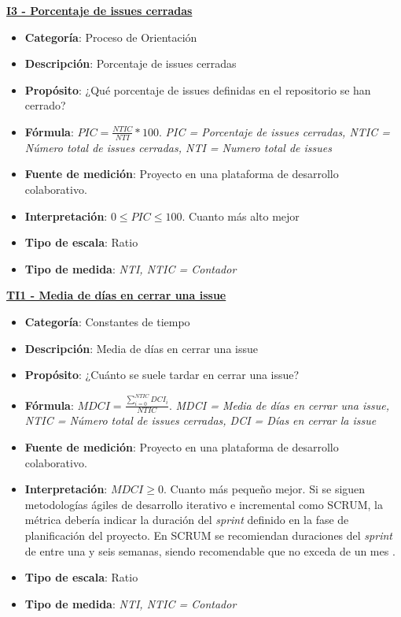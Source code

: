 \textbf{\underline{I3 - Porcentaje de issues cerradas}}

\begin{itemize}
	\item \textbf{Categoría}: Proceso de Orientación
	\item \textbf{Descripción}: Porcentaje de issues cerradas
	\item \textbf{Propósito}: ¿Qué porcentaje de issues definidas en el repositorio se han cerrado?
	\item \textbf{Fórmula}: $PIC = \frac{NTIC}{NTI}*100$. \textit{PIC = Porcentaje de issues cerradas, NTIC = Número total de issues cerradas, NTI = Numero total de issues}
	\item \textbf{Fuente de medición}: Proyecto en una plataforma de desarrollo colaborativo.
	\item \textbf{Interpretación}: $0 \leq PIC \leq 100$. Cuanto más alto mejor
	\item \textbf{Tipo de escala}: Ratio
	\item \textbf{Tipo de medida}: \textit{NTI, NTIC = Contador}
\end{itemize}

\textbf{\underline{TI1 - Media de días en cerrar una issue}}

\begin{itemize}
	\item \textbf{Categoría}: Constantes de tiempo
	\item \textbf{Descripción}:  Media de días en cerrar una issue
	\item \textbf{Propósito}: ¿Cuánto se suele tardar en cerrar una issue? 
	\item \textbf{Fórmula}: $MDCI = \frac{\sum_{i=0}^{NTIC}DCI_i}{NTIC}$. \textit{MDCI = Media de días en cerrar una issue, NTIC = Número total de issues cerradas, DCI = Días en cerrar la issue}
	\item \textbf{Fuente de medición}: Proyecto en una plataforma de desarrollo colaborativo.
	\item \textbf{Interpretación}: $MDCI \geq 0$. Cuanto más pequeño mejor. Si se siguen metodologías ágiles de desarrollo iterativo e incremental como SCRUM, la métrica debería indicar la duración del \textit{sprint} definido en la fase de planificación del proyecto. En SCRUM se recomiendan duraciones del \textit{sprint} de entre una y seis semanas, siendo recomendable que no exceda de un mes \cite{scrum_master_scrum_2019}.
	\item \textbf{Tipo de escala}: Ratio
	\item \textbf{Tipo de medida}: \textit{NTI, NTIC = Contador}
\end{itemize}

